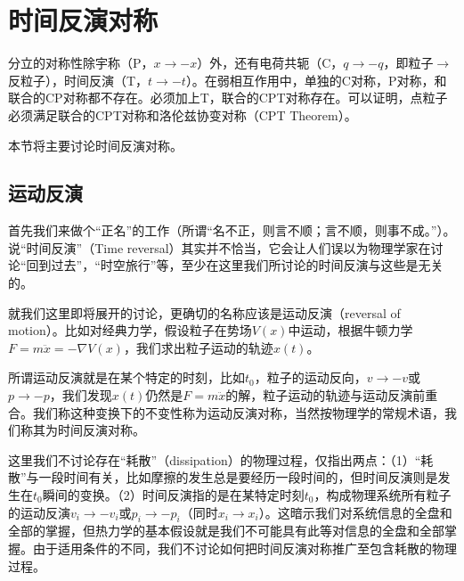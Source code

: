 \section{时间反演对称}

分立的对称性除宇称（P，$x \to -x$）外，还有电荷共轭（C，$q \to -q$，即粒子$\to$反粒子），时间反演（T，$t \to -t$）。在弱相互作用中，单独的C对称，P对称，和联合的CP对称都不存在。必须加上T，联合的CPT对称存在。可以证明，点粒子必须满足联合的CPT对称和洛伦兹协变对称（CPT Theorem）。

本节将主要讨论时间反演对称。

\subsection{运动反演}

首先我们来做个“正名”的工作（所谓“名不正，则言不顺；言不顺，则事不成。”）。说“时间反演”（Time reversal）其实并不恰当，它会让人们误以为物理学家在讨论“回到过去”，“时空旅行”等，至少在这里我们所讨论的时间反演与这些是无关的。

就我们这里即将展开的讨论，更确切的名称应该是运动反演（reversal of motion）。比如对经典力学，假设粒子在势场$V(x)$中运动，根据牛顿力学$F = m \ddot x = - \nabla V(x)$，我们求出粒子运动的轨迹$x(t)$。

所谓运动反演就是在某个特定的时刻，比如$t_0$，粒子的运动反向，$v \to - v$或$p \to -p$，我们发现$x(t)$仍然是$F = m \ddot x$的解，粒子运动的轨迹与运动反演前重合。我们称这种变换下的不变性称为运动反演对称，当然按物理学的常规术语，我们称其为时间反演对称。




这里我们不讨论存在“耗散”（dissipation）的物理过程，仅指出两点：（1）“耗散”与一段时间有关，比如摩擦的发生总是要经历一段时间的，但时间反演则是发生在$t_0$瞬间的变换。（2）时间反演指的是在某特定时刻$t_0$，构成物理系统所有粒子的运动反演$v_i \to - v_i$或$p_i \to - p_i$（同时$x_i \to x_i$）。这暗示我们对系统信息的全盘和全部的掌握，但热力学的基本假设就是我们不可能具有此等对信息的全盘和全部掌握。由于适用条件的不同，我们不讨论如何把时间反演对称推广至包含耗散的物理过程。

